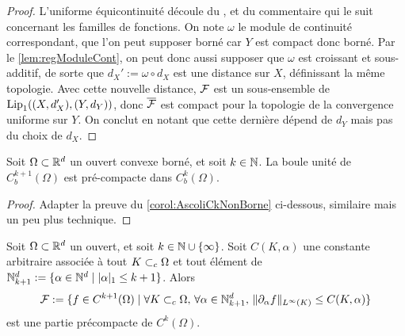 \begin{proof}
	L'uniforme équicontinuité découle du , et du commentaire qui le suit concernant les familles de fonctions. On note $\omega$ le module de continuité correspondant, que l'on peut supposer borné car $Y$ est compact donc borné. Par le \cref{lem:regModuleCont}, on peut donc aussi supposer que $\omega$ est croissant et sous-additif, de sorte que $d_X' := \omega\circ d_X$ est une distance sur $X$, définissant la même topologie. Avec cette nouvelle distance, $\mathcal{F}$ est un sous-ensemble de $\operatorname{Lip}_1((X,d'_X),(Y,d_Y))$, donc $\overline {\mathcal{F}}$ est compact pour la topologie de la convergence uniforme sur $Y$. On conclut en notant que cette dernière dépend de $d_Y$ mais pas du choix de $d_X$.
\end{proof}

\begin{corollary}[Ascoli $C^k$]
\label{corol:AscoliCk}
Soit $\Omega\subset \mathbb{R}^d$ un ouvert convexe borné, et soit $k \in \mathbb{N}$. La boule unité de $C^{k+1}_b(\Omega)$ est pré-compacte dans $C_b^k(\Omega)$.
\end{corollary}

\begin{proof}
	Adapter la preuve du \cref{corol:AscoliCkNonBorne} ci-dessous, similaire mais un peu plus technique. 
\end{proof}



\begin{corollary}
\label{corol:AscoliCkNonBorne}
Soit $\Omega\subset \mathbb{R}^d$ un ouvert, et soit $k \in \mathbb{N} \cup \{\infty\}$. Soit $C(K,\alpha)$ une constante arbitraire associée à tout $K \subset_c \Omega$ et tout élément de $\mathbb{N}^d_{k+1} := \{\alpha \in \mathbb{N}^d\mid |\alpha|_1 \leq k+1\}$.
Alors 
\begin{equation*}
	\mathcal{F} := \{ f \in C^{k+1}(\Omega) \mid \forall K \subset_c \Omega,\, \forall \alpha \in \mathbb{N}^d_{k+1},\,   \|\partial_\alpha f\|_{L^\infty(K)} \leq C(K,\alpha)\}
\end{equation*}
est une partie précompacte de $C^k(\Omega)$. %
\end{corollary}

